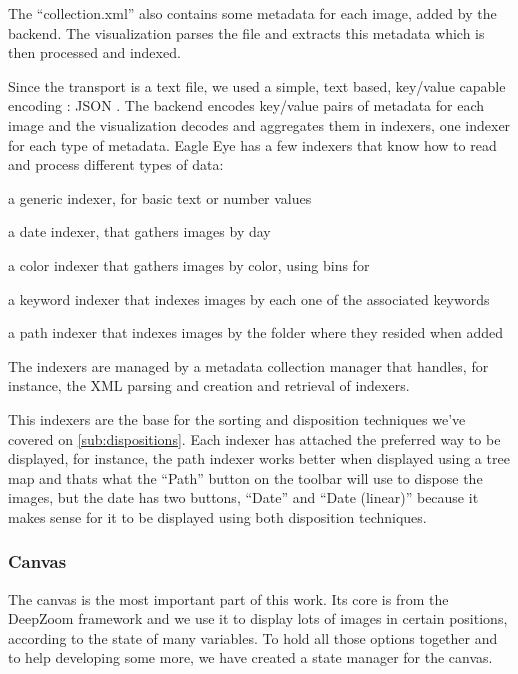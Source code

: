 The ``collection.xml'' also contains some metadata for each image, added by the backend. The visualization parses the file and extracts this metadata which is then processed and indexed.

Since the transport is a text file, we used a simple, text based, key/value capable encoding : JSON . The backend encodes key/value pairs of metadata for each image  and the visualization decodes and aggregates them in indexers, one indexer for each type of metadata. Eagle Eye has a few indexers that know how to read and process different types of data:
\begin{myitemize}
	\item{a generic indexer, for basic text or number values}
	\item{a date indexer, that gathers images by day}
	\item{a color indexer that gathers images by color, using  bins for }
	\item{a keyword indexer that indexes images by each one of the associated keywords}
	\item{a path indexer that indexes images by the folder where they resided when added}
\end{myitemize}

The indexers are managed by a metadata collection manager that handles, for instance, the XML parsing and creation and retrieval of indexers.

This indexers are the base for the sorting and disposition techniques we've covered on \ref{sub:dispositions}. Each indexer has attached the preferred way to be displayed, for instance, the path indexer works better when displayed using a tree map and thats what the ``Path'' button on the toolbar will use to dispose the images, but the date has two buttons, ``Date'' and ``Date (linear)'' because it makes sense for it to be displayed using both disposition techniques. 




\subsubsection{Canvas}

The canvas is the most important part of this work. Its core is from the DeepZoom framework and we use it to display lots of images in certain positions, according to the state of many variables. To hold all those options together and to help developing some more, we have created a state manager for the canvas.

